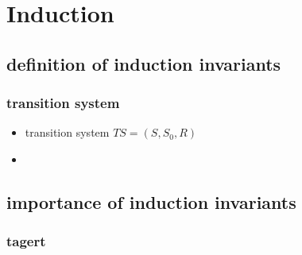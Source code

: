 \section{Induction}
\subsection{definition of induction invariants}
\begin{frame}
    \frametitle{transition system}
    \begin{itemize}
        \item transition system $TS=(S,S_{0},R)$
        \item 
    \end{itemize}
\end{frame}
\subsection{importance of induction invariants}
\begin{frame}
    \frametitle{tagert}
\end{frame}

